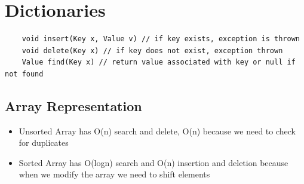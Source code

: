 \documentclass{article}
\begin{document}
  \section{Dictionaries}
  \begin{lstlisting}
    void insert(Key x, Value v) // if key exists, exception is thrown 
    void delete(Key x) // if key does not exist, exception thrown 
    Value find(Key x) // return value associated with key or null if not found
  \end{lstlisting}
  \subsection{Array Representation}
  \begin{itemize}[noitemsep]
  \item Unsorted Array has O(n) search and delete, O(n) because we need to check for duplicates
  \item Sorted Array has O(logn) search and O(n) insertion and deletion because when we modify the array we need to shift elements
  \end{itemize}
\end{document}
